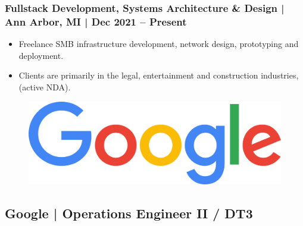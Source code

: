 \documentclass[letter,10pt]{article}
\begin{document}
\subsubsection*{Fullstack Development, Systems Architecture \& Design | Ann Arbor, MI | Dec 2021 – Present}
\label{sec:org91555c8}
\begin{itemize}
\item Freelance SMB infrastructure development, network design, prototyping and deployment.
\item Clients are primarily in the legal, entertainment and construction industries, (active NDA).
\end{itemize}




\begin{figure}
\includegraphics[width=0.85\linewidth]{./img/cr_google.jpg}
\end{figure}

\subsection*{Google | Operations Engineer II / DT3}
\label{sec:orge28dd4d}
\end{document}
